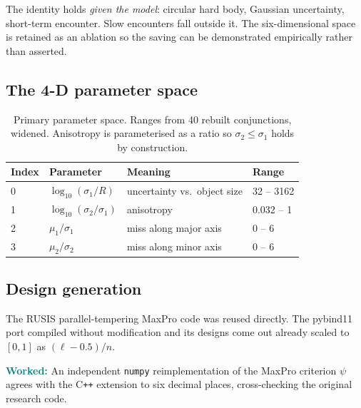 \documentclass[11pt]{article}
\newcommand{\worked}[1]{\textcolor{teal}{\textbf{Worked:}} #1}
\begin{document}
The identity holds \emph{given the model}: circular hard body, Gaussian
uncertainty, short-term encounter. Slow encounters fall outside it. The
six-dimensional space is retained as an ablation so the saving can be
demonstrated empirically rather than asserted.

\subsection{The 4-D parameter space}

\begin{table}[htbp]
\centering
\caption{Primary parameter space. Ranges from 40 rebuilt conjunctions,
         widened. Anisotropy is parameterised as a ratio so
         $\sigma_2 \le \sigma_1$ holds by construction.}
\label{tab:paramspace}
\begin{tabular}{llll}
\toprule
Index & Parameter & Meaning & Range \\
\midrule
0 & $\log_{10}(\sigma_1/R)$        & uncertainty vs.\ object size & 32 -- 3162 \\
1 & $\log_{10}(\sigma_2/\sigma_1)$ & anisotropy                   & 0.032 -- 1 \\
2 & $\mu_1/\sigma_1$               & miss along major axis        & 0 -- 6 \\
3 & $\mu_2/\sigma_2$               & miss along minor axis        & 0 -- 6 \\
\bottomrule
\end{tabular}
\end{table}

\subsection{Design generation}

The RUSIS parallel-tempering MaxPro code was reused directly. The
pybind11 port compiled without modification and its designs come out
already scaled to $[0,1]$ as $(\ell - 0.5)/n$.

\worked{An independent \texttt{numpy} reimplementation of the MaxPro
criterion $\psi$ agrees with the C\texttt{++} extension to six decimal
places, cross-checking the original research code.}
\end{document}
